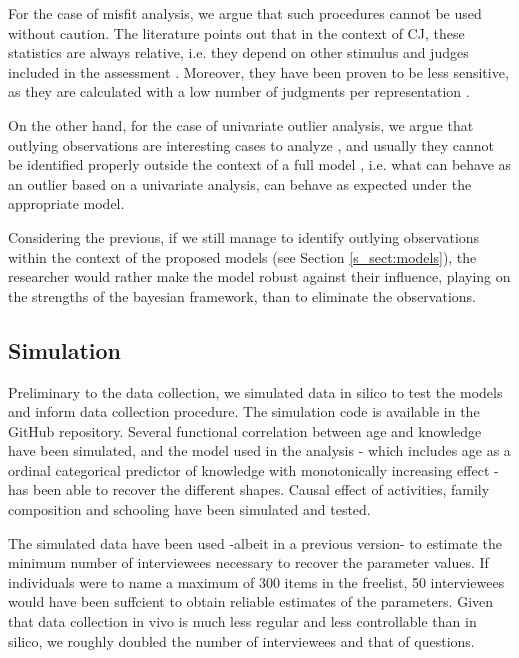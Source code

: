For the case of misfit analysis, we argue that such procedures cannot be used without caution. The literature points out that in the context of CJ, these statistics are always relative, i.e. they depend on other stimulus and judges included in the assessment \citep{Pollitt_2012a, Pollitt_2012b}. Moreover, they have been proven to be less sensitive, as they are calculated with a low number of judgments per representation \citep{Pollitt_2012a}. 

On the other hand, for the case of univariate outlier analysis, we argue that outlying observations are interesting cases to analyze \citep{McElreath_2020}, and usually they cannot be identified properly outside the context of a full model \citep{McElreath_2020}, i.e. what can behave as an outlier based on a univariate analysis, can behave as expected under the appropriate model. 

Considering the previous, if we still manage to identify outlying observations within the context of the proposed models (see Section \ref{s_sect:models}), the researcher would rather make the model robust against their influence, playing on the strengths of the bayesian framework, than to eliminate the observations. 




\subsection{Simulation}
Preliminary to the data collection, we simulated data in silico to test the models and inform data collection procedure. The simulation code is available in the GitHub repository. Several functional correlation between age and knowledge have been simulated, and the model used in the analysis - which includes age as a ordinal categorical predictor of knowledge with monotonically increasing effect - has been able to recover the different shapes. Causal effect of activities, family composition and schooling have been simulated and tested.

The simulated data have been used -albeit in a previous version- to estimate the minimum number of interviewees necessary to recover the parameter values. If individuals were to name a maximum of 300 items in the freelist, 50 interviewees would have been suffcient to obtain reliable estimates of the parameters. Given that data collection in vivo is much less regular and less controllable than in silico, we roughly doubled the number of interviewees and that of questions.


